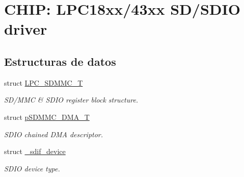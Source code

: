 \hypertarget{group___s_d_i_f__18_x_x__43_x_x}{}\section{C\+H\+IP\+: L\+P\+C18xx/43xx S\+D/\+S\+D\+IO driver}
\label{group___s_d_i_f__18_x_x__43_x_x}
\subsection*{Estructuras de datos}
\begin{DoxyCompactItemize}
\item 
struct \hyperlink{struct_l_p_c___s_d_m_m_c___t}{L\+P\+C\+\_\+\+S\+D\+M\+M\+C\+\_\+T}
\begin{DoxyCompactList}\small\item\em S\+D/\+M\+MC \& S\+D\+IO register block structure. \end{DoxyCompactList}\item 
struct \hyperlink{structp_s_d_m_m_c___d_m_a___t}{p\+S\+D\+M\+M\+C\+\_\+\+D\+M\+A\+\_\+T}
\begin{DoxyCompactList}\small\item\em S\+D\+IO chained D\+MA descriptor. \end{DoxyCompactList}\item 
struct \hyperlink{struct__sdif__device}{\+\_\+sdif\+\_\+device}
\begin{DoxyCompactList}\small\item\em S\+D\+IO device type. \end{DoxyCompactList}\end{DoxyCompactItemize}

